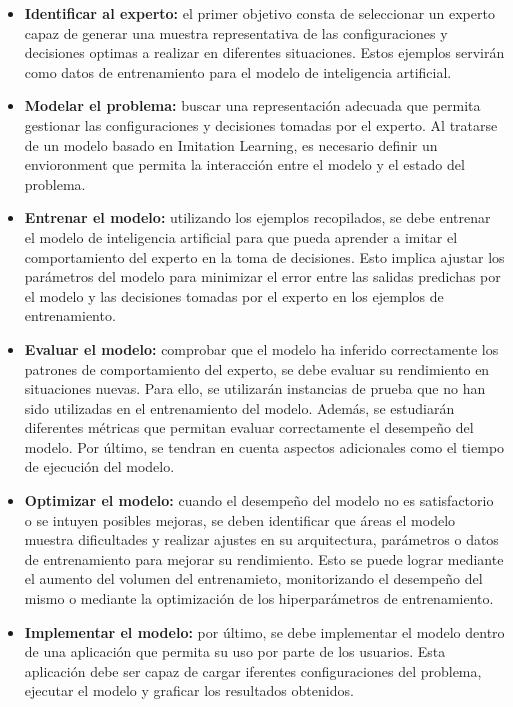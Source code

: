 \begin{itemize}
\item \textbf{Identificar al experto:} el primer objetivo consta de seleccionar un
experto capaz de generar una muestra representativa de las configuraciones y decisiones 
optimas a realizar en diferentes situaciones. Estos ejemplos servirán como datos 
de entrenamiento para el modelo de inteligencia artificial.
\item \textbf{Modelar el problema:} buscar una representación adecuada que permita gestionar 
las configuraciones y decisiones tomadas por el experto. Al tratarse de un modelo basado en 
Imitation Learning, es necesario definir un envioronment que permita la interacción entre el 
modelo y el estado del problema.
\item \textbf{Entrenar el modelo:} utilizando los ejemplos recopilados, se debe entrenar 
el modelo de inteligencia artificial para que pueda aprender a imitar el comportamiento 
del experto en la toma de decisiones. Esto implica ajustar los parámetros del modelo para 
minimizar el error entre las salidas predichas por el modelo y las decisiones tomadas por 
el experto en los ejemplos de entrenamiento.
\item \textbf{Evaluar el modelo:} comprobar que el modelo ha inferido correctamente
los patrones de comportamiento del experto, se debe evaluar su rendimiento en situaciones
nuevas. Para ello, se utilizarán instancias de prueba que no han sido utilizadas en el
entrenamiento del modelo. Además, se estudiarán diferentes métricas que permitan evaluar 
correctamente el desempeño del modelo. Por último, se tendran en cuenta aspectos adicionales 
como el tiempo de ejecución del modelo.
\item \textbf{Optimizar el modelo:} cuando el desempeño del modelo no es satisfactorio o 
se intuyen posibles mejoras, se deben identificar que áreas el modelo muestra dificultades y realizar ajustes 
en su arquitectura, parámetros o datos de entrenamiento para mejorar su rendimiento. Esto 
se puede lograr mediante el aumento del volumen del entrenamieto, monitorizando el desempeño
del mismo o mediante la optimización de los hiperparámetros de entrenamiento.
\item \textbf{Implementar el modelo:} por último, se debe implementar el modelo dentro de
una aplicación que permita su uso por parte de los usuarios. Esta aplicación debe ser capaz
de cargar iferentes configuraciones del problema, ejecutar el modelo y graficar los resultados
obtenidos.
\end{itemize}

